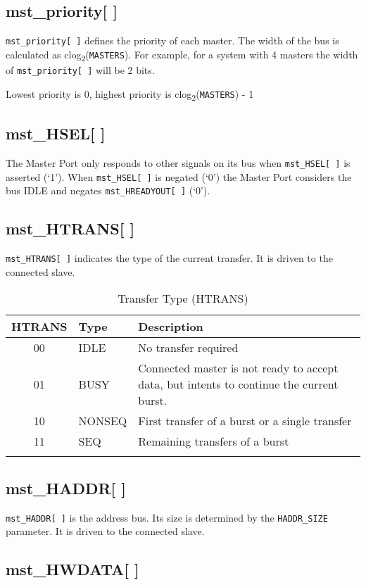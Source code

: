 \subsection{mst\_priority[ ]}\label{mst_priority}

\texttt{mst\_priority[\,]} defines the priority of each master. The width of the bus is calculated as clog\textsubscript{2}(\texttt{MASTERS}). For example, for a system with 4 masters the width of \texttt{mst\_priority[\,]} will be 2 bits.

Lowest priority is 0, highest priority is clog\textsubscript{2}(\texttt{MASTERS}) - 1

\subsection{mst\_HSEL[ ]}\label{mst_hsel}

The Master Port only responds to other signals on its bus when \texttt{mst\_HSEL[\,]} is
asserted (`1'). When \texttt{mst\_HSEL[\,]} is negated (`0') the Master Port
considers the bus IDLE and negates \texttt{mst\_HREADYOUT[\,]} (`0').

\subsection{mst\_HTRANS[ ]}\label{mst_htrans}

\texttt{mst\_HTRANS[ ]} indicates the type of the current transfer. It is driven to
the connected slave.

\begin{longtable}[]{@{}clp{9cm}@{}}
\toprule
HTRANS & Type & Description\tabularnewline
\midrule
\endhead
00 & IDLE & No transfer required\tabularnewline
01 & BUSY & Connected master is not ready to accept data, but intents to
continue the current burst.\tabularnewline
10 & NONSEQ & First transfer of a burst or a single
transfer\tabularnewline
11 & SEQ & Remaining transfers of a burst\tabularnewline
\bottomrule
\caption{Transfer Type (HTRANS)}
\end{longtable}


\subsection{mst\_HADDR[ ]}\label{mst_haddr}

\texttt{mst\_HADDR[\,]} is the address bus. Its size is determined by the \texttt{HADDR\_SIZE}
parameter. It is driven to the connected slave.

\subsection{mst\_HWDATA[ ]}\label{mst_hwdata}

